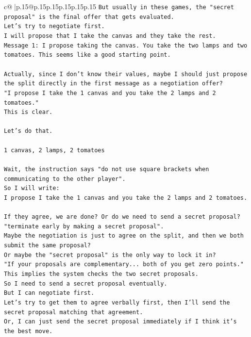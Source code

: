 \documentclass{article}
\begin{document}
{\begin{supertabular}{c@{$\;$}|p{.15\linewidth}@{}p{.15\linewidth}p{.15\linewidth}p{.15\linewidth}p{.15\linewidth}p{.15\linewidth}}
{{{\texttt{But usually in these games, the "secret proposal" is the final offer that gets evaluated.} \\
\texttt{Let's try to negotiate first.} \\
\texttt{I will propose that I take the canvas and they take the rest.} \\
\texttt{Message 1: I propose taking the canvas. You take the two lamps and two tomatoes. This seems like a good starting point.} \\
\\ 
\texttt{Actually, since I don't know their values, maybe I should just propose the split directly in the first message as a negotiation offer?} \\
\texttt{"I propose I take the 1 canvas and you take the 2 lamps and 2 tomatoes."} \\
\texttt{This is clear.} \\
\\ 
\texttt{Let's do that.} \\
\\ 
\texttt{1 canvas, 2 lamps, 2 tomatoes} \\
\\ 
\texttt{Wait, the instruction says "do not use square brackets when communicating to the other player".} \\
\texttt{So I will write:} \\
\texttt{I propose I take the 1 canvas and you take the 2 lamps and 2 tomatoes.} \\
\\ 
\texttt{If they agree, we are done? Or do we need to send a secret proposal?} \\
\texttt{"terminate early by making a secret proposal".} \\
\texttt{Maybe the negotiation is just to agree on the split, and then we both submit the same proposal?} \\
\texttt{Or maybe the "secret proposal" is the only way to lock it in?} \\
\texttt{"If your proposals are complementary... both of you get zero points." This implies the system checks the two secret proposals.} \\
\texttt{So I need to send a secret proposal eventually.} \\
\texttt{But I can negotiate first.} \\
\texttt{Let's try to get them to agree verbally first, then I'll send the secret proposal matching that agreement.} \\
\texttt{Or, I can just send the secret proposal immediately if I think it's the best move.} \\
}}}
\end{supertabular}}
\end{document}
